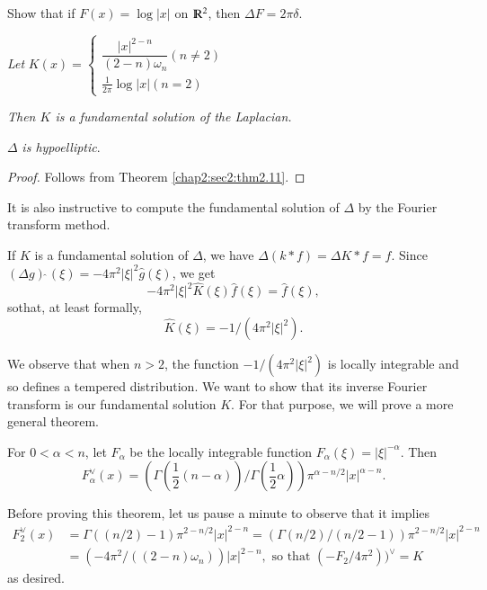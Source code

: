 \begin{exercise}
  Show that if $F(x) = \log |x| $ on $\varmathbb{R}^2$, then $\Delta F
  = 2 \pi \delta$. 
\end{exercise} 

\setcounter{coro}{16}
\begin{coro} \label{chap2:sec4:coro2.17}%
  \textit{Let} $K(x)=
  \begin{cases}
    \dfrac{|x|^{2-n}}{(2 -n ) \omega_n}(n \neq 2)\\
    \frac{1}{2 \pi} \log |x| (n= 2)
  \end{cases}$ 
  
  \textit{Then $K$ is a fundamental solution of the Laplacian.}
\end{coro} 

\begin{coro} \label{chap2:sec4:coro2.18}%
   $\Delta $ \textit{is hypoelliptic}.
 \end{coro} 

 \begin{proof}
   Follows from Theorem \ref{chap2:sec2:thm2.11}.
\end{proof}

It is also instructive to compute the fundamental solution of $\Delta$
by the Fourier transform method.	 

If $K$ is a fundamental solution of $\Delta $, we have $\Delta (k * f)
= \Delta K * f =f$. Since $(\Delta g) \hat{~ } (\xi ) =- 4 \pi^2
|\xi|^2 \hat{g}(\xi)$, we get 
$$
- 4 \pi^2 | \xi |^2 \hat {K} ( \xi) \hat{f} ( \xi) = \hat{f }(\xi),
$$
so\pageoriginale that, at least formally,
$$
\hat{K}(\xi) = -1/(4 \pi ^2 | \xi|^2 ). 
$$

We observe that when $n>2$, the function $-1/(4 \pi ^2 | \xi|^2)$ is
locally integrable and so defines a tempered distribution. We want to
show that its inverse Fourier transform is our fundamental solution 
$K$. For that purpose, we will prove a more general theorem.

\setcounter{thm}{18}
\begin{thm} \label{chap2:sec4:thm2.19}%
  For $0 < \alpha < n$, let  $F_{\alpha}$ be the locally integrable
  function $F_ {\alpha }(\xi )= | \xi | ^{- \alpha}$. Then 
  $$
  F ^{\vee}_{\alpha}(x) = \left( \Gamma \left( \frac{1}{2} (n -
  \alpha )\right) / \Gamma
  \left(\frac{1}{2}\alpha \right) \right) \pi ^{ \alpha -n /2} |x| ^{\alpha -n}. 
  $$
  
  Before proving this theorem, let us pause a minute to observe that
  it implies  
  \begin{align*}
    F^\vee_2 (x) &=\Gamma ((n/2)-1) \pi ^{2-n/2}|x|^{2-n}= ( \Gamma
    (n/2)/(n/2-1)) \pi ^{2-n/2}|x|^{2-n}\\ 
    &= (-4 \pi ^2 / ((2 -n) \omega_n )) |x|^{2-n}, \text{ so that } (-F_2
    / 4\pi ^2))^ \vee =K  
  \end{align*}
  as desired.
\end{thm}
 

